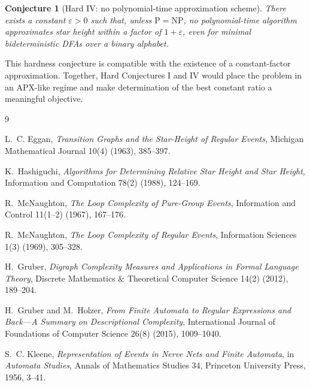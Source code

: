 \documentclass[11pt]{article}
\newtheorem{conjecture}{Conjecture}
\begin{document}
\begin{conjecture}[Hard IV: no polynomial-time approximation scheme]
There exists a constant $\varepsilon>0$ such that, unless
$\mathrm P=\mathrm{NP}$, no polynomial-time algorithm approximates star height
within a factor of $1+\varepsilon$, even for minimal bideterministic DFAs over
a binary alphabet.
\end{conjecture}

This hardness conjecture is compatible with the existence of a constant-factor
approximation. Together, Hard Conjectures I and IV would place the problem in
an APX-like regime and make determination of the best constant ratio a
meaningful objective.


\begin{thebibliography}{9}

L.~C. Eggan,
\emph{Transition Graphs and the Star-Height of Regular Events},
Michigan Mathematical Journal 10(4) (1963), 385--397.

K.~Hashiguchi,
\emph{Algorithms for Determining Relative Star Height and Star Height},
Information and Computation 78(2) (1988), 124--169.

R.~McNaughton,
\emph{The Loop Complexity of Pure-Group Events},
Information and Control 11(1--2) (1967), 167--176.

R.~McNaughton,
\emph{The Loop Complexity of Regular Events},
Information Sciences 1(3) (1969), 305--328.

H.~Gruber,
\emph{Digraph Complexity Measures and Applications in Formal Language
Theory},
Discrete Mathematics \& Theoretical Computer Science 14(2) (2012),
189--204.

H.~Gruber and M.~Holzer,
\emph{From Finite Automata to Regular Expressions and Back---A Summary on
Descriptional Complexity},
International Journal of Foundations of Computer Science 26(8) (2015),
1009--1040.

S.~C. Kleene,
\emph{Representation of Events in Nerve Nets and Finite Automata},
in \emph{Automata Studies}, Annals of Mathematics Studies 34,
Princeton University Press, 1956, 3--41.

\end{thebibliography}
\end{document}
